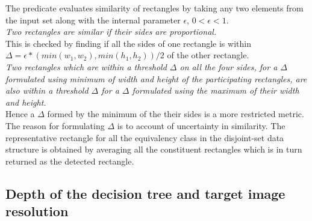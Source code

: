 \noindent
The predicate evaluates similarity of rectangles by taking any two elements from the input set along with the internal parameter $\epsilon$, $0 < \epsilon < 1$. \\

\textit{Two rectangles are similar if their sides are proportional.} \\

\noindent
This is checked by finding if all the sides of one rectangle is within $\Delta = \epsilon * (min(w_1, w_2), min(h_1, h_2)) / 2$ of the other rectangle. \\
\textit{Two rectangles which are within a threshold $\Delta$ on all the four sides, for a $\Delta$ formulated using \textit{minimum} of width and height of the participating rectangles, are also within a threshold $\Delta$ for a $\Delta$ formulated using the maximum of their width and height.} \\

%
\noindent
Hence a $\Delta$ formed by the minimum of the their sides is a more restricted metric. The reason for formulating $\Delta$ is to account of uncertainty in similarity. The representative rectangle for all the equivalency class in the disjoint-set data structure is obtained by averaging all the constituent rectangles which is in turn returned as the detected rectangle. 

\subsection{Depth of the decision tree and target image resolution}

